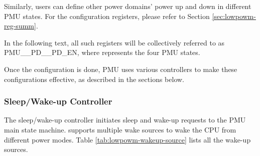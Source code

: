 \documentclass[main\_\_EN.tex]{subfiles}
\begin{document}
Similarly, users can define other power domains' power up and down in different PMU states. For the configuration registers, please refer to Section \ref{sec:lowpowm-reg-summ}.

\begin{tiplisting}
In the following text, all such registers will be collectively referred to as PMU\_\_PD\_\_PD\_EN, where  represents the four PMU states.
\end{tiplisting}



Once the configuration is done, PMU uses various controllers to make these configurations effective, as described in the sections below.

\subsubsection{Sleep/Wake-up Controller}

The sleep/wake-up controller initiates sleep and wake-up requests to the PMU main state machine. \chipname{} supports multiple wake sources to wake the CPU from different power modes. Table \ref{tab:lowpowm-wakeup-source} lists all the
wake-up sources.
\end{document}
